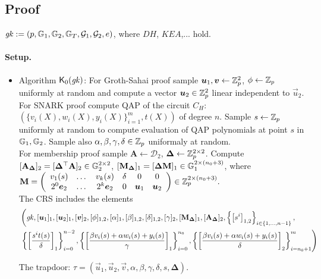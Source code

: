 \subsection{Proof}


$\mathit{gk}  := (p,\mathbb{G}_1,\mathbb{G}_2,\mathbb{G}_T,\mathcal{G}_1,\mathcal{G}_2,e)$, where $DH$, $KEA$,... hold.

\paragraph{Setup.} \begin{itemize}
	\item Algorithm $\mathsf{K}_0(\mathit{gk})$: For Groth-Sahai proof sample $\vec{u}_1,\vec{v} \gets \Z_p^2$, $\phi\gets \mathbb{Z}_p$ uniformly at random and compute a vector $\vec{u}_2\in \Z_p^2$ linear independent to $\vec{u}_2$.\\
	For SNARK proof compute QAP of the circuit $C_H$: $\left(\{v_i(X), w_i(X), y_i(X)\}_{i=1}^m, t(X)\right)$ of degree $n$. Sample $s \gets \mathbb{Z}_p$ uniformly at random to compute evaluation of QAP polynomials at point $s$ in $\mathbb{G}_1, \mathbb{G}_2$. Sample also $\alpha, \beta, \gamma, \delta \in \mathbb{Z}_p$ uniformaly at random.\\
	For membership proof sample $\mathbf{A} \gets \mathcal{D}_2$,
	$\mathbf{\Delta}\gets \mathbb{Z}_p^{2\times 2}$. Compute $[\mathbf{A}_{\mathbf{\Delta}}]_2=[\mathbf{\Delta}^{\top}\mathbf{A}]_2 \in \mathbb{G}_2^{2\times 2}$, $[\mathbf{M}_{\mathbf{\Delta}}]_1=[\mathbf{\Delta}\mathbf{M}]_1 \in \mathbb{G}_1^{2\times (n_0+3)}$, 
	where 
	$\mathbf{M}=\left(\begin{array}{c c c c c c}
	v_1(s) & \dots & v_k(s) & \delta & 0 & 0 \\
	2^0\vec{e}_2 & \dots & 2^k \vec{e}_2 & 0 & \vec{u}_1 &\vec{u}_2\\
	\end{array}\right) \in \Z_p^{2\times (n_0+3)}.$\\
	The CRS includes the elements 	
	\[\begin{split}
	&\left(\gk,[\vec{u}_1]_1,[\vec{u}_2]_1,[\vec{v}]_2,[\phi]_{1,2},[\alpha]_{1},[\beta]_{1,2},[\delta]_{1,2},[\gamma]_2,[\mathbf{M}_{\mathbf{\Delta}}]_1,[\mathbf{A}_{\mathbf{\Delta}}]_2,\left\{\left[s^{i}\right]_{1,2}\right\}_{i\in\{1,\dots,n-1\}},\right.\\
	&\left.
	\left\{\left[\frac{s^i t(s)}{\delta}\right]_1\right\}_{i=0}^{n-2},\left\{\left[\frac{\beta v_i(s)+\alpha w_i(s) +y_i(s)}{\gamma}\right]_1\right\}_{i=0}^{n_0},\left\{\left[\frac{\beta v_i(s)+\alpha w_i(s) +y_i(s)}{\delta}\right]_2\right\}_{i=n_0+1}^{m}\right)
	\end{split}\]
	
	The trapdoor: $\tau = (\vec{u}_1,\vec{u}_2,\vec{v}, \alpha, \beta,\gamma,\delta, s, \mathbf{\Delta})$.
\end{itemize} 



